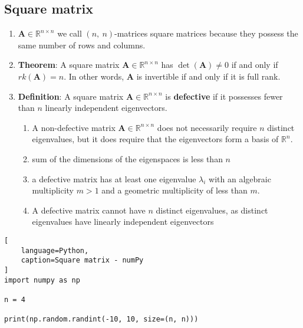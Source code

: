 \subsection{Square matrix}

\begin{enumerate}
    \item $\bm{A} \in \mathbb{R}^{n\times n}$ we call $(n,\ n)$-matrices square matrices because they possess the same number of rows and columns.
    \hfill \cite{mfml/book/mml/Deisenroth-Faisal-Ong}

    \item \textbf{Theorem}: A square matrix $\bm{A} \in \mathbb{R}^{n\times n}$ has $\det(\bm{A}) \neq 0$ if and only if $rk(\bm{A}) = n$. 
    In other words, $\bm{A}$ is invertible if and only if it is full rank.
    \hfill \cite{mfml/book/mml/Deisenroth-Faisal-Ong}

    \item \textbf{Definition}: A square matrix $\bm{A} \in \mathbb{R}^{n\times n}$ is \textbf{defective} if it possesses  fewer than $n$ linearly independent eigenvectors.
    \hfill \cite{mfml/book/mml/Deisenroth-Faisal-Ong}
    \begin{enumerate}
        \item A non-defective matrix $\bm{A} \in \mathbb{R}^{n\times n}$ does not necessarily require $n$ distinct eigenvalues, but it does require that the eigenvectors form a basis of $\mathbb{R}^n$.
        \hfill \cite{mfml/book/mml/Deisenroth-Faisal-Ong}

        \item sum of the dimensions of the eigenspaces is less than $n$
        \hfill \cite{mfml/book/mml/Deisenroth-Faisal-Ong}

        \item a defective matrix has at least one eigenvalue $\lambda_i$ with an algebraic multiplicity $m > 1$ and a geometric multiplicity of less than $m$.
        \hfill \cite{mfml/book/mml/Deisenroth-Faisal-Ong}

        \item A defective matrix cannot have $n$ distinct eigenvalues, as distinct eigenvalues have linearly independent eigenvectors
        \hfill \cite{mfml/book/mml/Deisenroth-Faisal-Ong}
    \end{enumerate}
\end{enumerate}


\begin{lstlisting}[
    language=Python,
    caption=Square matrix - numPy
]
import numpy as np

n = 4

print(np.random.randint(-10, 10, size=(n, n)))
\end{lstlisting}


